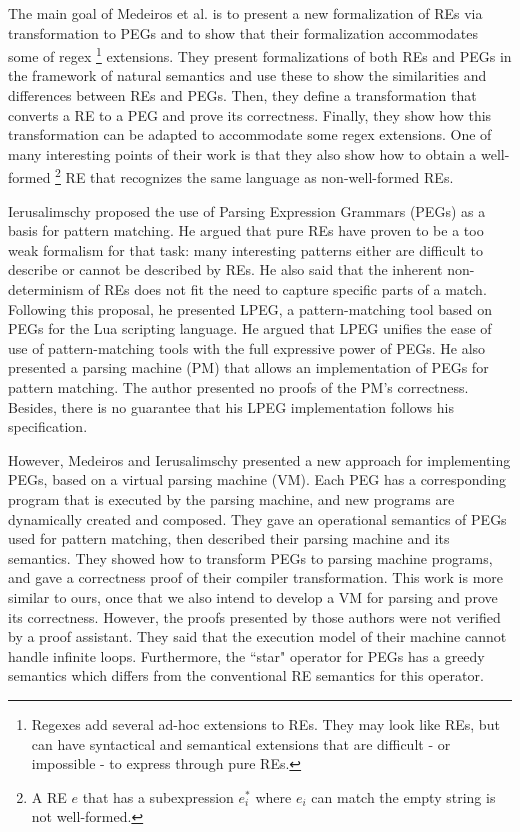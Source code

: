 \documentclass[oneside,12pt]{scrbook}
\theoremstyle{definition}
\theoremstyle{plain}
\theoremstyle{definition}
\begin{document}
The main goal of Medeiros et al. \cite{Mascarenhas2011} is to present a new formalization of REs via transformation to PEGs and to show that their formalization accommodates some of regex \footnote{Regexes add several ad-hoc extensions to REs. They may look like REs, but can have syntactical and semantical extensions that are difficult - or impossible - to express through pure REs.} extensions. They present formalizations of both REs and PEGs in the framework of natural semantics and use these to show the similarities and differences between REs and PEGs. Then, they define a transformation that converts a RE to a PEG and prove its correctness. Finally, they show how this transformation can be adapted to accommodate some regex extensions. One of many interesting points of their work is that they also show how to obtain a well-formed \footnote{A RE $e$ that has a subexpression $e^*_i$ where $e_i$ can match the empty string is not well-formed.} RE that recognizes the same language as non-well-formed REs.
 


Ierusalimschy \cite{Ierusalimschy2009} proposed the use of Parsing Expression Grammars (PEGs) as a basis for pattern matching. He argued that pure REs have proven to be a too weak formalism for that task: many interesting patterns either are difficult to describe or cannot be described by REs. He also said that the inherent non-determinism of REs does not fit the need to capture specific parts of a match. Following this proposal, he presented LPEG, a pattern-matching tool based on PEGs for the Lua scripting language. He argued that LPEG unifies the ease of use of pattern-matching tools with the full expressive power of PEGs. He also presented a parsing machine (PM) that allows an implementation of PEGs for pattern matching. The author presented no proofs of the PM's correctness. Besides, there is no guarantee that his LPEG implementation follows his specification.


However, Medeiros and Ierusalimschy \cite{Medeiros2008} presented a new approach for implementing PEGs, based on a virtual parsing machine (VM). Each PEG has a corresponding program that is executed by the parsing machine, and new programs are dynamically created and composed. They gave an operational semantics of PEGs used for pattern matching, then described their parsing machine and its semantics.
They showed how to transform PEGs to parsing machine programs, and gave a correctness proof of their compiler transformation. This work is more similar to ours, once that we also intend to develop a VM for parsing and prove its correctness. However, the proofs presented by those authors were not verified by a proof assistant. They said that the execution model of their machine cannot handle infinite loops. Furthermore, the ``star" operator for PEGs has a greedy semantics which differs from the conventional RE semantics for this operator.
\end{document}
